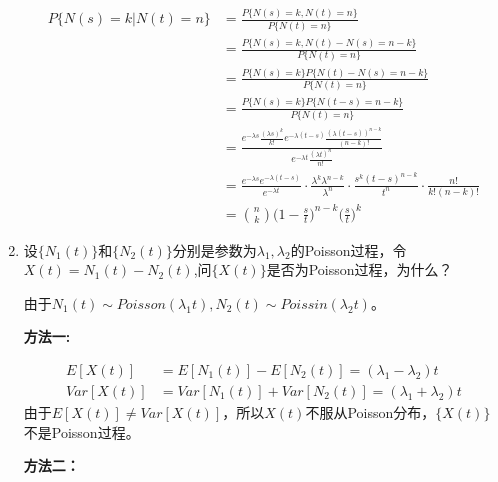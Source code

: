 \begin{enumerate}
	      \begin{align*}
		      P\{N(s)=k|N(t)=n\}
		       & =\frac{P\{N(s)=k,N(t)=n\}}{P\{N(t)=n\}}                                                                \\
		       & =\frac{P\{N(s)=k,N(t)-N(s)=n-k\}}{P\{N(t)=n\}}                                                         \\
		       & =\frac{P\{N(s)=k\}P\{N(t)-N(s)=n-k\}}{P\{N(t)=n\}}                                                     \\
		       & =\frac{P\{N(s)=k\}P\{N(t-s)=n-k\}}{P\{N(t)=n\}}                                                        \\
		       & =\frac{e^{-\lambda s}\frac{(\lambda s)^k}{k!}e^{-\lambda (t-s)}\frac{(\lambda (t-s))^{n-k}}{(n-k)!}}
		      {e^{-\lambda t}\frac{(\lambda t)^n}{n!}}                                                                  \\
		       & =\frac{e^{-\lambda s}e^{-\lambda (t-s)}}{e^{-\lambda t}}\cdot \frac{\lambda^k\lambda^{n-k}}{\lambda^n}
		      \cdot \frac{s^k(t-s)^{n-k}}{t^n}\cdot \frac{n!}{k!(n-k)!}                                                 \\
		       & ={n\choose k}\bigg(1-\frac{s}{t} \bigg)^{n-k}\bigg(\frac{s}{t}\bigg)^k
	      \end{align*}

	\item 设\(\{N_1(t)\}\)和\(\{N_2(t)\}\)分别是参数为\(\lambda_1,\lambda_2\)的Poisson过程，令\(X(t)=N_1(t)-N_2(t)\),问\(\{X(t)\}\)是否为Poisson过程，为什么？

	      由于\(N_1(t)\sim Poisson(\lambda_1t),N_2(t)\sim Poissin(\lambda_2t)\)。

	      \textbf{方法一:}

	      \begin{align*}
		      E[X(t)]   & =E[N_1(t)]-E[N_2(t)]=(\lambda_1-\lambda_2)t     \\
		      Var[X(t)] & =Var[N_1(t)]+Var[N_2(t)]=(\lambda_1+\lambda_2)t
	      \end{align*}
	      由于\(E[X(t)]\neq Var[X(t)]\)，所以\(X(t)\)不服从Poisson分布，\(\{X(t)\}\)不是Poisson过程。

	      \textbf{方法二：}


\end{enumerate}
